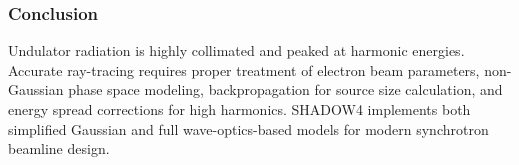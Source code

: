 
\subsubsection{Conclusion}

Undulator radiation is highly collimated and peaked at harmonic energies. Accurate ray-tracing requires proper treatment of electron beam parameters, non-Gaussian phase space modeling, backpropagation for source size calculation, and energy spread corrections for high harmonics. SHADOW4 implements both simplified Gaussian and full wave-optics-based models for modern synchrotron beamline design.

% 